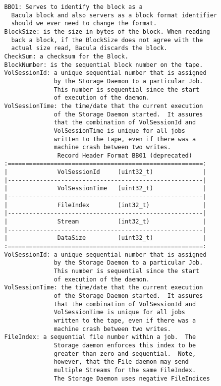 \begin{verbatim}
   BBO1: Serves to identify the block as a
     Bacula block and also servers as a block format identifier
     should we ever need to change the format.
   BlockSize: is the size in bytes of the block. When reading
     back a block, if the BlockSize does not agree with the
     actual size read, Bacula discards the block.
   CheckSum: a checksum for the Block.
   BlockNumber: is the sequential block number on the tape.
   VolSessionId: a unique sequential number that is assigned
                 by the Storage Daemon to a particular Job.
                 This number is sequential since the start
                 of execution of the daemon.
   VolSessionTime: the time/date that the current execution
                 of the Storage Daemon started.  It assures
                 that the combination of VolSessionId and
                 VolSessionTime is unique for all jobs
                 written to the tape, even if there was a
                 machine crash between two writes.
                  Record Header Format BB01 (deprecated)
   :=======================================================:
   |              VolSessionId     (uint32_t)              |
   |-------------------------------------------------------|
   |              VolSessionTime   (uint32_t)              |
   |-------------------------------------------------------|
   |              FileIndex        (int32_t)               |
   |-------------------------------------------------------|
   |              Stream           (int32_t)               |
   |-------------------------------------------------------|
   |              DataSize         (uint32_t)              |
   :=======================================================:
   VolSessionId: a unique sequential number that is assigned
                 by the Storage Daemon to a particular Job.
                 This number is sequential since the start
                 of execution of the daemon.
   VolSessionTime: the time/date that the current execution
                 of the Storage Daemon started.  It assures
                 that the combination of VolSessionId and
                 VolSessionTime is unique for all jobs
                 written to the tape, even if there was a
                 machine crash between two writes.
   FileIndex: a sequential file number within a job.  The
                 Storage daemon enforces this index to be
                 greater than zero and sequential.  Note,
                 however, that the File daemon may send
                 multiple Streams for the same FileIndex.
                 The Storage Daemon uses negative FileIndices

\end{verbatim}
